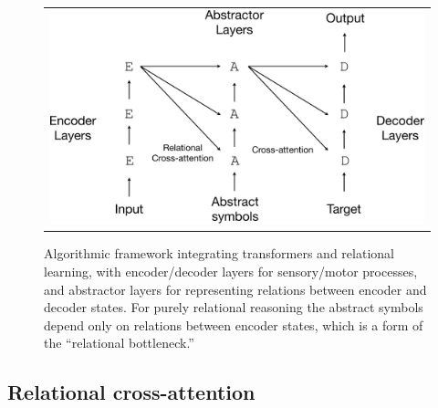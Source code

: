 \begin{figure}[t]
    \vspace{-3mm}
    \begin{center}
    \begin{tabular}{c}
        \hskip5pt\includegraphics[width=.60\textwidth]{figures/algorithm-diagram3-crop}
    \end{tabular}
    \caption{Algorithmic framework integrating transformers and relational learning, with encoder/decoder layers for
    sensory/motor processes, and abstractor layers for representing relations between encoder and decoder states. For purely relational reasoning the abstract symbols depend only on relations between encoder states, which is a form of the ``relational bottleneck.''}
    \label{fig:algo}
    \vskip-12pt
    \end{center}
\end{figure}



\subsection{Relational cross-attention}

